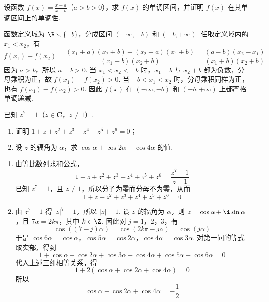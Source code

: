 \begin{problem}
设函数 \(f(x) = \frac{x + a}{x + b}\)（\(a > b > 0\)），求 \(f(x)\) 的单调区间，并证明 \(f(x)\) 在其单调区间上的单调性.
\end{problem}

\begin{solution}
函数定义域为 \(\R\smallsetminus\{-b\}\)，分成区间 \((-\infty,-b)\) 和 \((-b,+\infty)\). 任取定义域内的 \(x_1<x_2\)，有
\[
f(x_1)-f(x_2)
=\frac{(x_1+a)(x_2+b)-(x_2+a)(x_1+b)}{(x_1+b)(x_2+b)}
=\frac{(a-b)(x_2-x_1)}{(x_1+b)(x_2+b)}
\]
因为 \(a>b\)，所以 \(a-b>0\). 当 \(x_1<x_2<-b\) 时，\(x_1+b\) 与 \(x_2+b\) 都为负数，分母乘积为正，故 \(f(x_1)-f(x_2)>0\). 当 \(-b<x_1<x_2\) 时，分母乘积同样为正，也有 \(f(x_1)-f(x_2)>0\). 因此 \(f(x)\) 在 \((-\infty,-b)\) 和 \((-b,+\infty)\) 上都严格单调递减.
\end{solution}

\begin{problem}
已知 \(z^{7} = 1\)（\(z \in \mathbf{C}\)，\(z \neq 1\)）.

\begin{enumerate}
\item 证明 \(1 + z + z^{2} + z^{3} + z^{4} + z^{5} + z^{6} = 0\)；
\item 设 \(z\) 的辐角为 \(\alpha\)，求 \(\cos \alpha + \cos 2\alpha + \cos 4\alpha\) 的值.
\end{enumerate}
\end{problem}

\begin{solution}
\begin{enumerate}
\item 由等比数列求和公式，
\[
1+z+z^2+z^3+z^4+z^5+z^6=\frac{z^7-1}{z-1}
\]
已知 \(z^7=1\)，且 \(z\neq1\)，所以分子为零而分母不为零，从而
\[
1+z+z^2+z^3+z^4+z^5+z^6=0
\]

\item 由 \(z^7=1\) 得 \(|z|^7=1\)，所以 \(|z|=1\). 设 \(z\) 的辐角为 \(\alpha\)，则 \(z=\cos\alpha+\i\sin\alpha\)，且 \(7\alpha=2k\pi\)，其中 \(k\in\Z\). 因此对 \(j=1\)，\(2\)，\(3\)，有
\[
\cos\left((7-j)\alpha\right)=\cos\left(2k\pi-j\alpha\right)=\cos(j\alpha)
\]
于是 \(\cos6\alpha=\cos\alpha\)，\(\cos5\alpha=\cos2\alpha\)，\(\cos4\alpha=\cos3\alpha\).
对第一问的等式取实部，得到
\[
1+\cos\alpha+\cos2\alpha+\cos3\alpha+\cos4\alpha+\cos5\alpha+\cos6\alpha=0
\]
代入上述三组相等关系，得
\[
1+2\left(\cos\alpha+\cos2\alpha+\cos4\alpha\right)=0
\]
所以
\[
\cos\alpha+\cos2\alpha+\cos4\alpha=-\frac12
\]
\end{enumerate}
\end{solution}

